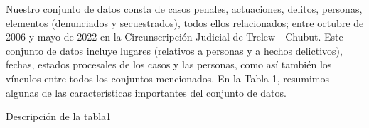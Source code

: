 Nuestro conjunto de datos consta de casos penales, actuaciones, delitos, personas, elementos (denunciados y secuestrados), todos ellos relacionados; entre octubre de 2006 y mayo de 2022 en la Circunscripción Judicial de Trelew - Chubut. Este conjunto de datos incluye lugares (relativos a personas y a hechos delictivos), fechas, estados procesales de los casos y las personas, como así también los vínculos entre todos los conjuntos mencionados. En la Tabla 1, resumimos algunas de las características importantes del conjunto de datos.
\begin{table}
	\caption{Descripción de la tabla1}\label{tab3}
\end{table}
